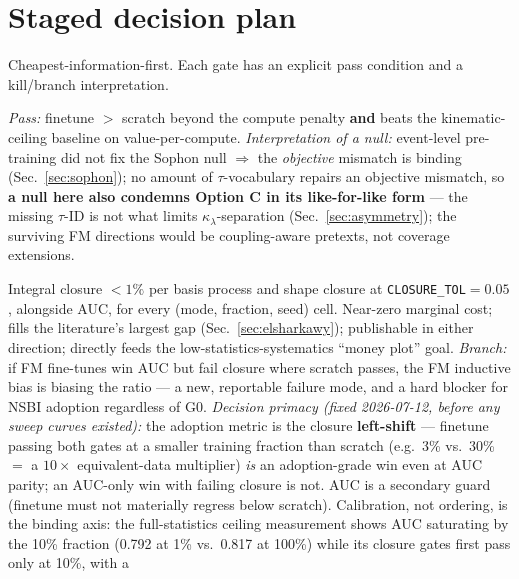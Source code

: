 \documentclass[11pt]{article}
\newcommand{\kl}{\ensuremath{\kappa_\lambda}}
\begin{document}
\section{Staged decision plan}
\label{sec:plan}

Cheapest-information-first. Each gate has an explicit pass condition and a
kill/branch interpretation.

\begin{description}[leftmargin=2.6em,style=nextline]
\item[G0 --- Run the existing sweep (Option A, stock or corner schema).]
  \emph{Pass:} finetune $>$ scratch beyond the compute penalty
  \textbf{and} beats the kinematic-ceiling baseline on value-per-compute.
  \emph{Interpretation of a null:} event-level pre-training did not fix the
  Sophon null $\Rightarrow$ the \emph{objective} mismatch is binding
  (Sec.~\ref{sec:sophon}); no amount of $\tau$-vocabulary repairs an
  objective mismatch, so \textbf{a null here also condemns Option C in its
  like-for-like form} --- the missing $\tau$-ID is not what limits
  \kl-separation (Sec.~\ref{sec:asymmetry}); the surviving FM directions
  would be coupling-aware pretexts, not coverage extensions.
\item[G0.5 --- Add calibration/closure metrics to the sweep evaluation.]
  Integral closure $<1\%$ per basis process and shape closure at
  \texttt{CLOSURE\_TOL}$=0.05$, alongside AUC, for every (mode, fraction,
  seed) cell. Near-zero marginal cost; fills the literature's largest gap
  (Sec.~\ref{sec:elsharkawy}); publishable in either direction; directly
  feeds the low-statistics-systematics ``money plot'' goal.
  \emph{Branch:} if FM fine-tunes win AUC but fail closure where scratch
  passes, the FM inductive bias is biasing the ratio --- a new, reportable
  failure mode, and a hard blocker for NSBI adoption regardless of G0.
  \emph{Decision primacy (fixed 2026-07-12, before any sweep curves existed):}
  the adoption metric is the closure \textbf{left-shift} --- finetune passing
  both gates at a smaller training fraction than scratch (e.g.\ 3\% vs.\ 30\%
  $=$ a $10\times$ equivalent-data multiplier) \emph{is} an adoption-grade win
  even at AUC parity; an AUC-only win with failing closure is not. AUC is a
  secondary guard (finetune must not materially regress below scratch).
  Calibration, not ordering, is the binding axis: the full-statistics ceiling
  measurement shows AUC saturating by the 10\% fraction (0.792 at 1\% vs.\
  0.817 at 100\%) while its closure gates first pass only at 10\%, with a

\end{description}
\end{document}

